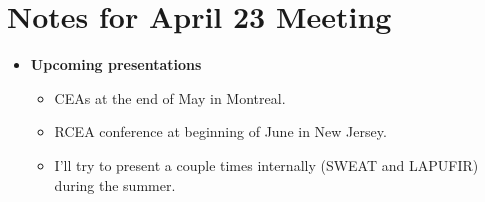 \documentclass{article}
\begin{document}

\section*{Notes for April 23 Meeting}


\vspace{0.3cm}

\begin{itemize}
	\item \textbf{Upcoming presentations}
	\begin{itemize}
		\item CEAs at the end of May in Montreal.
		\item RCEA conference at beginning of June in New Jersey.
		\item I'll try to present a couple times internally (SWEAT and LAPUFIR) during the summer.
	\end{itemize}
\end{itemize}
\end{document}
